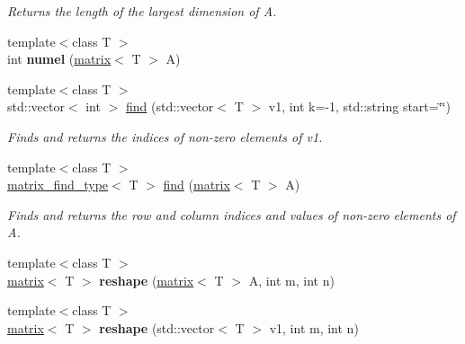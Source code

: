 \begin{DoxyCompactItemize}
\begin{DoxyCompactList}\small\item\em Returns the length of the largest dimension of A. \end{DoxyCompactList}\item 
\hypertarget{namespacekeycpp_a14d8a9ae8d6988eeff52fa777e75bd20}{{\footnotesize template$<$class T $>$ }\\int {\bfseries numel} (\hyperlink{classkeycpp_1_1matrix}{matrix}$<$ T $>$ A)}\label{namespacekeycpp_a14d8a9ae8d6988eeff52fa777e75bd20}

\item 
\hypertarget{namespacekeycpp_af93acd2c9e3e2e47bbf796143b994a18}{{\footnotesize template$<$class T $>$ }\\std\-::vector$<$ int $>$ \hyperlink{namespacekeycpp_af93acd2c9e3e2e47bbf796143b994a18}{find} (std\-::vector$<$ T $>$ v1, int k=-\/1, std\-::string start=\char`\"{}\char`\"{})}\label{namespacekeycpp_af93acd2c9e3e2e47bbf796143b994a18}

\begin{DoxyCompactList}\small\item\em Finds and returns the indices of non-\/zero elements of v1. \end{DoxyCompactList}\item 
\hypertarget{namespacekeycpp_a5c7bf08adf4c09275f9e16cd510b7357}{{\footnotesize template$<$class T $>$ }\\\hyperlink{structkeycpp_1_1matrix__find__type}{matrix\-\_\-find\-\_\-type}$<$ T $>$ \hyperlink{namespacekeycpp_a5c7bf08adf4c09275f9e16cd510b7357}{find} (\hyperlink{classkeycpp_1_1matrix}{matrix}$<$ T $>$ A)}\label{namespacekeycpp_a5c7bf08adf4c09275f9e16cd510b7357}

\begin{DoxyCompactList}\small\item\em Finds and returns the row and column indices and values of non-\/zero elements of A. \end{DoxyCompactList}\item 
\hypertarget{namespacekeycpp_a9c4772f020269af1ae89c9cb0164d81c}{{\footnotesize template$<$class T $>$ }\\\hyperlink{classkeycpp_1_1matrix}{matrix}$<$ T $>$ {\bfseries reshape} (\hyperlink{classkeycpp_1_1matrix}{matrix}$<$ T $>$ A, int m, int n)}\label{namespacekeycpp_a9c4772f020269af1ae89c9cb0164d81c}

\item 
\hypertarget{namespacekeycpp_ab8f45bfa36c10a24c117fb96be879cce}{{\footnotesize template$<$class T $>$ }\\\hyperlink{classkeycpp_1_1matrix}{matrix}$<$ T $>$ {\bfseries reshape} (std\-::vector$<$ T $>$ v1, int m, int n)}\label{namespacekeycpp_ab8f45bfa36c10a24c117fb96be879cce}


\end{DoxyCompactItemize}
